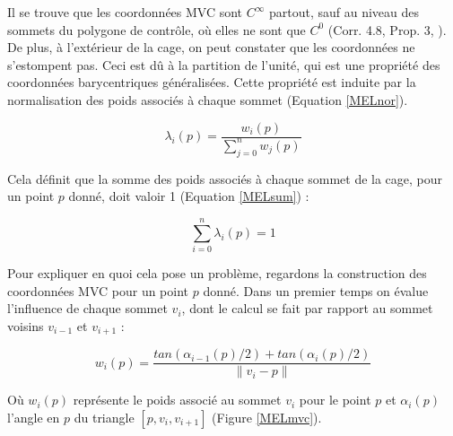 Il se trouve que les coordonnées MVC sont $C^\infty$ partout, sauf au
niveau des sommets du polygone de contrôle, où elles ne sont que $C^0$
(Corr. 4.8, Prop. 3, \cite{HF06}). De plus, à l'extérieur de la cage,
on peut constater que les coordonnées ne s'estompent pas. Ceci est dû
à la partition de l'unité, qui est une propriété des coordonnées
barycentriques généralisées. Cette propriété est induite par la
normalisation des poids associés à chaque sommet (Equation
\ref{MELnor}).

\begin{equation}
  \lambda_i(p) = \frac{w_i(p)}{\sum_{j=0}^n w_j(p)}
  \label{MELnor}
\end{equation}

Cela définit que la somme des poids associés à chaque sommet de la
cage, pour un point $p$ donné, doit valoir 1 (Equation \ref{MELsum}) :

\begin{equation}
  \sum_{i=0}^n \lambda_i(p) = 1
  \label{MELsum}
\end{equation}

Pour expliquer en quoi cela pose un problème, regardons la
construction des coordonnées MVC pour un point $p$ donné. Dans un
premier temps on évalue l'influence de chaque sommet $v_i$, dont le
calcul se fait par rapport au sommet voisins $v_{i-1}$ et $v_{i+1}$ :

\begin{equation}
  w_i(p) = \frac{tan(\alpha_{i-1}(p)/2) + tan(\alpha_{i}(p)/2)}{\|v_i - p\|}
\end{equation}

Où $w_i(p)$ représente le poids associé au sommet $v_i$ pour le point
$p$ et $\alpha_i(p)$ l'angle en $p$ du triangle $[p,v_i,v_{i+1}]$
(Figure \ref{MELmvc}).

